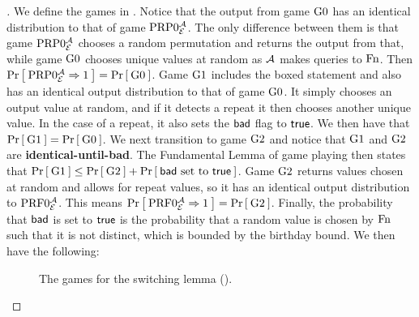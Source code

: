 \begin{proof}[]
	 We define the games in . Notice that the output from game ${{\textnormal G}}0$ has an identical distribution to that of game $\textnormal{PRP}0_{\cal E}^{\mathcal A}$. The only difference between them is that game $\textnormal{PRP}0_{\cal E}^{\mathcal A}$ chooses a random permutation and returns the output from that, while game ${{\textnormal G}}0$ chooses unique values at random as ${\mathcal A}$ makes queries to $\textnormal{Fn}$. Then $\Pr\left[\: \textnormal{PRP}0_{\cal E}^{\mathcal A}\Rightarrow1 \:\right] = \Pr\left[\: {{\textnormal G}}0 \:\right]$. Game ${{\textnormal G}}1$ includes the boxed statement and also has an identical output distribution to that of game ${{\textnormal G}}0$. It simply chooses an output value at random, and if it detects a repeat it then chooses another unique value. In the case of a repeat, it also sets the $\mathsf{bad}$ flag to $\mathsf{true}$. We then have that $\Pr\left[\: {{\textnormal G}}1 \:\right] = \Pr\left[\: {{\textnormal G}}0 \:\right]$. We next transition to game ${{\textnormal G}}2$ and notice that ${{\textnormal G}}1$ and ${{\textnormal G}}2$ are \textbf{identical-until-bad}. The Fundamental Lemma of game playing then states that $\Pr\left[\: {{\textnormal G}}1 \:\right] \leq \Pr\left[\: {{\textnormal G}}2 \:\right] + \Pr\left[\: \mathsf{bad} \text{ set to } \mathsf{true} \:\right]$. Game ${{\textnormal G}}2$ returns values chosen at random and allows for repeat values, so it has an identical output distribution to $\textnormal{PRF}0_{\cal E}^{\mathcal A}$. This means $\Pr\left[\: \textnormal{PRF}0_{\cal E}^{\mathcal A}\Rightarrow1 \:\right] = \Pr\left[\: {{\textnormal G}}2 \:\right]$. Finally, the probability that $\mathsf{bad}$ is set to $\mathsf{true}$ is the probability that a random value is chosen by $\textnormal{Fn}$ such that it is not distinct, which is bounded by the birthday bound. We then have the following:
	 
	 \begin{figure}
	 	\centering
	 	\caption{The games for the switching lemma ().}
	 	\label{fig:switching}	
	 \end{figure} 
	 

\end{proof}
